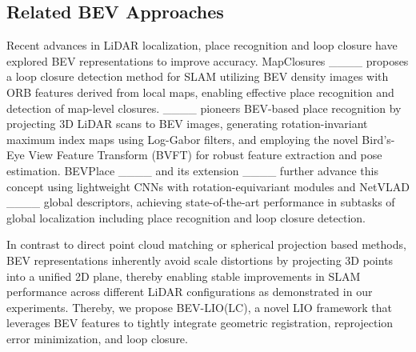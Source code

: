 \vspace{-1.5mm}
\subsection{Related BEV Approaches}
\vspace{-1mm}
Recent advances in LiDAR localization, place recognition and loop closure have explored BEV representations to improve accuracy.
MapClosures ____ proposes a loop closure detection method for SLAM utilizing BEV density images with ORB features derived from local maps, enabling effective place recognition and detection of map-level closures. 
____ pioneers BEV-based place recognition by projecting 3D LiDAR scans to BEV images, generating rotation-invariant maximum index maps using Log-Gabor filters, and employing the novel Bird’s-Eye View Feature Transform (BVFT) for robust feature extraction and pose estimation. 
BEVPlace ____ and its extension ____ further advance this concept using lightweight CNNs with rotation-equivariant modules and NetVLAD ____ global descriptors, achieving state-of-the-art performance in subtasks of global localization including place recognition and loop closure detection.
\par In contrast to direct point cloud matching or spherical projection based methods, BEV representations inherently avoid scale distortions by projecting 3D points into a unified 2D plane, thereby enabling stable improvements in SLAM performance across different LiDAR configurations as demonstrated in our experiments. Thereby, we propose BEV-LIO(LC), a novel LIO framework that leverages BEV features to tightly integrate geometric registration, reprojection error minimization, and loop closure.
\vspace{-0.5mm}


